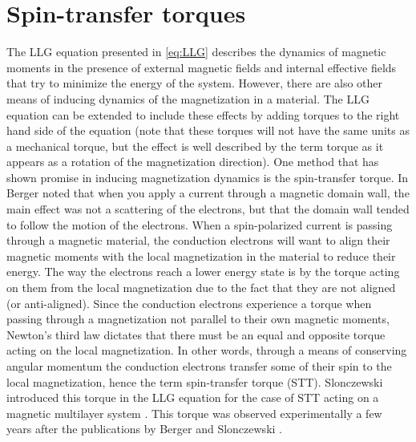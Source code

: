 \section{Spin-transfer torques}
The LLG equation presented in \eqref{eq:LLG} describes the dynamics of magnetic moments in the presence of external magnetic fields and internal effective fields that try to minimize the energy of the system. However, there are also other means of inducing dynamics of the magnetization in a material. The LLG equation can be extended to include these effects by adding torques to the right hand side of the equation (note that these torques will not have the same units as a mechanical torque, but the effect is well described by the term torque as it appears as a rotation of the magnetization direction). One method that has shown promise in inducing magnetization dynamics is the spin-transfer torque. In \cite{Berger1978} Berger noted that when you apply a current through a magnetic domain wall, the main effect was not a scattering of the electrons, but that the domain wall tended to follow the motion of the electrons. When a spin-polarized current is passing through a magnetic material, the conduction electrons will want to align their magnetic moments with the local magnetization in the material to reduce their energy. The way the electrons reach a lower energy state is by the torque acting on them from the local magnetization due to the fact that they are not aligned (or anti-aligned). Since the conduction electrons experience a torque when passing through a magnetization not parallel to their own magnetic moments, Newton's third law dictates that there must be an equal and opposite torque acting on the local magnetization. In other words, through a means of conserving angular momentum the conduction electrons transfer some of their spin to the local magnetization, hence the term spin-transfer torque (STT). Slonczewski introduced this torque in the LLG equation for the case of STT acting on a magnetic multilayer system \cite{Slonczewski1996}. This torque was observed experimentally a few years after the publications by Berger and Slonczewski \cite{Tsoi1998,Myers1999}.

